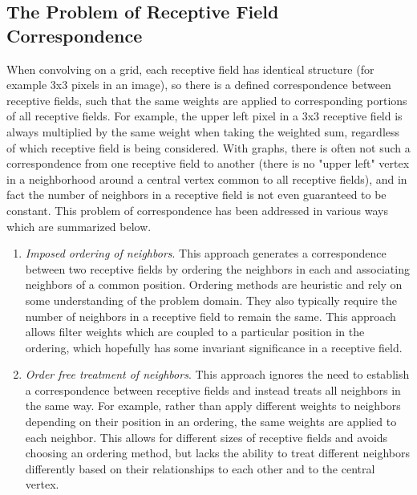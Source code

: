 \subsection{The Problem of Receptive Field Correspondence}
When convolving on a grid, each receptive field has identical structure (for example 3x3 pixels in an image), so there is a defined correspondence between receptive fields, such  that the same weights are applied to corresponding portions of all receptive fields. 
For example, the upper left pixel in a 3x3 receptive field is always multiplied by the same weight when taking the weighted sum, regardless of which receptive field is being considered.
With graphs, there is often not such a correspondence from one receptive field to another (there is no "upper left" vertex in a neighborhood around a central vertex common to all receptive fields), and in fact the number of neighbors in a receptive field is not even guaranteed to be constant.
This problem of correspondence has been addressed in various ways which are summarized below.
\begin{enumerate}
	\item \textit{Imposed ordering of neighbors}. This approach generates a correspondence between two receptive fields by ordering the neighbors in each and associating neighbors of a common position. 
	Ordering methods are heuristic and rely on some understanding of the problem domain.
	They also typically require the number of neighbors in a receptive field to remain the same.
	This approach allows filter weights which are coupled to a particular position in the ordering, which hopefully has some invariant significance in a receptive field.
	
	\item \textit{Order free treatment of neighbors}. This approach ignores the need to establish a correspondence between receptive fields and instead treats all neighbors in the same way.
	For example, rather than apply different weights to neighbors depending on their position in an ordering, the same weights are applied to each neighbor.
	This allows for different sizes of receptive fields and avoids choosing an ordering method, but lacks the ability to treat different neighbors differently based on their relationships to each other and to the central vertex.
	
\end{enumerate}


